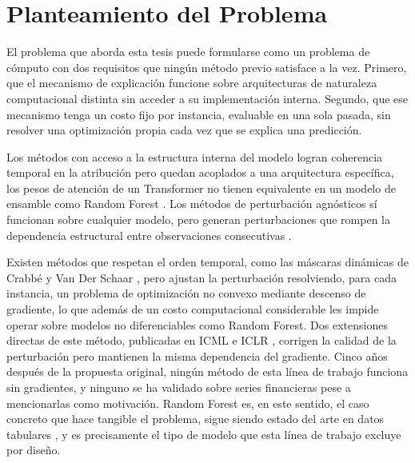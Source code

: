 \section{Planteamiento del Problema}
\label{sec:planteamiento_problema}

El problema que aborda esta tesis puede formularse como un problema de cómputo con dos requisitos que ningún método previo satisface a la vez. Primero, que el mecanismo de explicación funcione sobre arquitecturas de naturaleza computacional distinta sin acceder a su implementación interna. Segundo, que ese mecanismo tenga un costo fijo por instancia, evaluable en una sola pasada, sin resolver una optimización propia cada vez que se explica una predicción.

Los métodos con acceso a la estructura interna del modelo logran coherencia temporal en la atribución pero quedan acoplados a una arquitectura específica, los pesos de atención de un Transformer no tienen equivalente en un modelo de ensamble como Random Forest \cite{arsenault2025}. Los métodos de perturbación agnósticos sí funcionan sobre cualquier modelo, pero generan perturbaciones que rompen la dependencia estructural entre observaciones consecutivas \cite{tonekaboni2020, huang2025}.

Existen métodos que respetan el orden temporal, como las máscaras dinámicas de Crabbé y Van Der Schaar \cite{crabbe2021}, pero ajustan la perturbación resolviendo, para cada instancia, un problema de optimización no convexo mediante descenso de gradiente, lo que además de un costo computacional considerable les impide operar sobre modelos no diferenciables como Random Forest. Dos extensiones directas de este método, publicadas en ICML \cite{enguehard2023} e ICLR \cite{liu2024contralsp}, corrigen la calidad de la perturbación pero mantienen la misma dependencia del gradiente. Cinco años después de la propuesta original, ningún método de esta línea de trabajo funciona sin gradientes, y ninguno se ha validado sobre series financieras pese a mencionarlas como motivación. Random Forest es, en este sentido, el caso concreto que hace tangible el problema, sigue siendo estado del arte en datos tabulares \cite{grinsztajn2022}, y es precisamente el tipo de modelo que esta línea de trabajo excluye por diseño.

